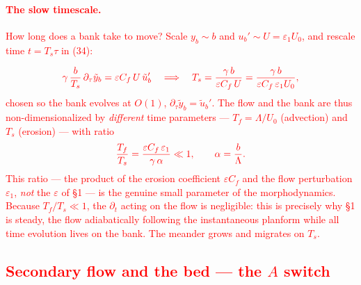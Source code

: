 \documentclass[11pt]{article}
\newcommand{\R}[1]{\textcolor{red}{#1}}
\begin{document}
\R{\paragraph{The slow timescale.} How long does a bank take to move? Scale
$y_b\sim b$ and $u_b'\sim U=\varepsilon_1U_0$, and rescale time $t=T_s\tau$ in (34):}
\begin{equation}
\R{\gamma\,\frac{b}{T_s}\,\partial_\tau\tilde y_b=\varepsilon C_f\,U\,\tilde u_b'
 \quad\Longrightarrow\quad
 T_s=\frac{\gamma\,b}{\varepsilon C_f\,U}
    =\frac{\gamma\,b}{\varepsilon C_f\,\varepsilon_1U_0},}
\end{equation}
\R{chosen so the bank evolves at $O(1)$, $\partial_\tau\tilde y_b=\tilde u_b'$.
The flow and the bank are thus non-dimensionalized by \emph{different} time
parameters --- $T_f=\Lambda/U_0$ (advection) and $T_s$ (erosion) --- with ratio}
\begin{equation}
\R{\frac{T_f}{T_s}=\frac{\varepsilon C_f\,\varepsilon_1}{\gamma\,\alpha}\ll1,
 \qquad\alpha=\frac{b}{\Lambda}.}
\end{equation}
\R{This ratio --- the product of the erosion coefficient $\varepsilon C_f$ and the
flow perturbation $\varepsilon_1$, \emph{not} the $\varepsilon$ of §1 --- is the
genuine small parameter of the morphodynamics. Because $T_f/T_s\ll1$, the
$\partial_t$ acting on the flow is negligible: this is precisely why §1 is steady,
the flow adiabatically following the instantaneous planform while all time
evolution lives on the bank. The meander grows and migrates on $T_s$.}

\R{\section{Secondary flow and the bed --- the $A$ switch}}
\end{document}
